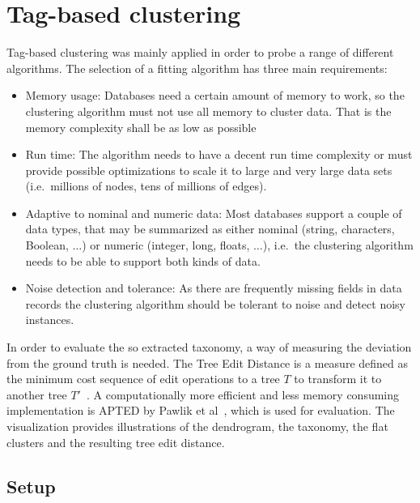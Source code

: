 \section{Tag-based clustering}\label{\positionnumber}
Tag-based clustering was mainly applied in order to probe a range of different algorithms.
The selection of a fitting algorithm has three main requirements:
\begin{itemize}
    \item Memory usage: Databases need a certain amount of memory to work, so the clustering algorithm must not use all memory to cluster data. That is the memory complexity shall be as low as possible
    \item Run time: The algorithm needs to have a decent run time complexity or must provide possible optimizations to scale it to large and very large data sets (i.e.~millions of nodes, tens of millions of edges).
    \item Adaptive to nominal and numeric data: Most databases support a couple of data types, that may be summarized as either nominal (string, characters, Boolean, $\dots$) or numeric (integer, long, floats, $\dots$), i.e.~the clustering algorithm needs to be able to support both kinds of data.
    \item Noise detection and tolerance: As there are frequently missing fields in data records the clustering algorithm should be tolerant to noise and detect noisy instances.
\end{itemize}
 In order to evaluate the so extracted taxonomy, a way of measuring the deviation from the ground truth is needed. The Tree Edit Distance is a measure defined as the minimum cost sequence of edit operations to a tree $T$ to transform it to another tree $T'$~\cite{Tai:1979:TCP:322139.322143}. A computationally more efficient and less memory consuming implementation is APTED by Pawlik et al~\cite{pawlik2016tree}, which is used for evaluation. The visualization provides illustrations of the dendrogram, the taxonomy, the flat clusters and the resulting tree edit distance.

\subsection{Setup}
